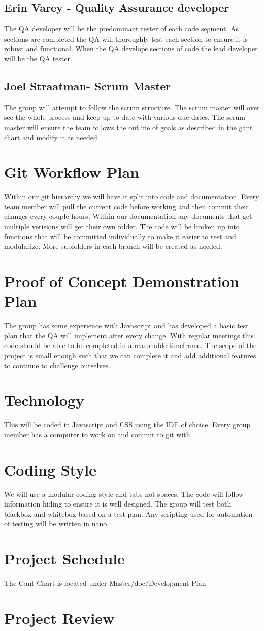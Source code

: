 \documentclass{article}
\begin{document}
\subsection{Erin Varey - Quality Assurance developer}
The QA developer will be the predominant tester of each code segment. As sections are completed the QA will thoroughly test each section to ensure it is robust and functional. When the QA develops sections of code the lead developer will be the QA tester. 
\subsection{Joel Straatman- Scrum Master}
The group will attempt to follow the scrum structure. The scrum master will over see the whole process and keep up to date with various due dates. The scrum master will ensure the team follows the outline of goals as described in the gant chart and modify it as needed. 
\section{Git Workflow Plan}
Within our git hierarchy we will have it split into code and documentation. Every team member will pull the current code before working and then commit their changes every couple hours. Within our documentation any documents that get multiple verisions will get their own folder. The code will be broken up into functions that will be committed individually to make it easier to test and modularize. More subfolders in each branch will be created as needed.
\section{Proof of Concept Demonstration Plan}
The group has some experience with Javascript and has developed a basic test plan that the QA will implement after every change. With regular meetings this code should be able to be completed in a reasonable timeframe. The scope of the project is small enough such that we can complete it and add additional features to continue to challenge ourselves.
\section{Technology}
This will be coded in Javascript and CSS using the IDE of choice. Every group member has a computer to work on and commit to git with.
\section{Coding Style}
We will use a modular coding style and tabs not spaces. The code will follow information hiding to ensure it is well designed. The group will test both blackbox and whitebox based on a test plan. Any scripting used for automation of testing will be written in nano.
\section{Project Schedule}
The Gant Chart is located under Master/doc/Development Plan
\section{Project Review}
\end{document}
